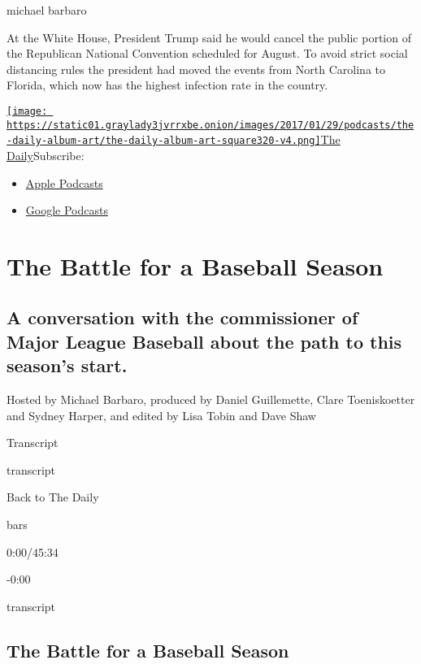 michael barbaro

At the White House, President Trump said he would cancel the public
portion of the Republican National Convention scheduled for August. To
avoid strict social distancing rules the president had moved the events
from North Carolina to Florida, which now has the highest infection rate
in the country.

\href{https://www.nytimes3xbfgragh.onion/column/the-daily}{\texttt{[image: https://static01.graylady3jvrrxbe.onion/images/2017/01/29/podcasts/the-daily-album-art/the-daily-album-art-square320-v4.png]}The
Daily}Subscribe:

\begin{itemize}
\tightlist
\item
  \href{https://itunes.apple.com/us/podcast/id1200361736}{Apple
  Podcasts}
\item
  \href{https://www.google.com/podcasts?feed=aHR0cHM6Ly9yc3MuYXJ0MTkuY29tL3RoZS1kYWlseQ\%3D\%3D}{Google
  Podcasts}
\end{itemize}

\hypertarget{the-battle-for-a-baseball-season-1}{%
\section{The Battle for a Baseball
Season}\label{the-battle-for-a-baseball-season-1}}

\hypertarget{a-conversation-with-the-commissioner-of-major-league-baseball-about-the-path-to-this-seasons-start-1}{%
\subsection{A conversation with the commissioner of Major League
Baseball about the path to this season's
start.}\label{a-conversation-with-the-commissioner-of-major-league-baseball-about-the-path-to-this-seasons-start-1}}

Hosted by Michael Barbaro, produced by Daniel Guillemette, Clare
Toeniskoetter and Sydney Harper, and edited by Lisa Tobin and Dave Shaw

Transcript

transcript

Back to The Daily

bars

0:00/45:34

-0:00

transcript

\hypertarget{the-battle-for-a-baseball-season-2}{%
\subsection{The Battle for a Baseball
Season}\label{the-battle-for-a-baseball-season-2}}

